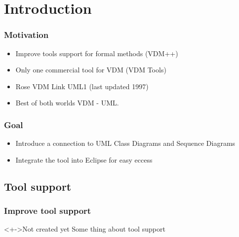 %
%
\section{Introduction}
%
%
\frame
{
  \frametitle{Motivation}

\begin{center}
  \begin{itemize}
  		\item<1-> Improve tools support for formal methods (VDM++)
  		\item<2-> Only one commercial tool for VDM (VDM Tools) 
	  	\item<3-> Rose VDM Link UML1 (last updated 1997) 
		\item<4-> Best of both worlds VDM - UML.  		
  \end{itemize}
\end{center}
}



%
%
\frame
{
  \frametitle{Goal}

\begin{center}
  \begin{itemize}
  		\item<1-> Introduce a connection to UML Class Diagrams and Sequence Diagrams
  		\item<2-> Integrate the tool into Eclipse for easy eccess
	  	
  \end{itemize}
\end{center}
}

\subsection{Tool support}
%
%
\frame
{
  \frametitle{Improve tool support}
\begin{center}
	\begin{block}<+->{Not created yet}
	Some thing about tool support
	\end{block}

\end{center}
}


